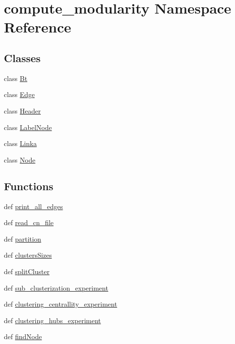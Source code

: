 \hypertarget{namespacecompute__modularity}{\section{compute\+\_\+modularity Namespace Reference}
\label{namespacecompute__modularity}
}
\subsection*{Classes}
\begin{DoxyCompactItemize}
\item 
class \hyperlink{classcompute__modularity_1_1_bt}{Bt}
\item 
class \hyperlink{classcompute__modularity_1_1_edge}{Edge}
\item 
class \hyperlink{classcompute__modularity_1_1_header}{Header}
\item 
class \hyperlink{classcompute__modularity_1_1_label_node}{Label\+Node}
\item 
class \hyperlink{classcompute__modularity_1_1_linka}{Linka}
\item 
class \hyperlink{classcompute__modularity_1_1_node}{Node}
\end{DoxyCompactItemize}
\subsection*{Functions}
\begin{DoxyCompactItemize}
\item 
def \hyperlink{namespacecompute__modularity_ae7003a81a318f8a965c997e545ed8637}{print\+\_\+all\+\_\+edges}
\item 
def \hyperlink{namespacecompute__modularity_ac8b393251a94473680052f2c0482706e}{read\+\_\+cn\+\_\+file}
\item 
def \hyperlink{namespacecompute__modularity_a607f9b8be1bf581cedf443b517adcf10}{partition}
\item 
def \hyperlink{namespacecompute__modularity_a3dea8443d139544a91b33a28ee635080}{clusters\+Sizes}
\item 
def \hyperlink{namespacecompute__modularity_a632a3219fb7710031adbb61fda6f7b21}{split\+Cluster}
\item 
def \hyperlink{namespacecompute__modularity_aa868b771a28de7a8784a1ac26c141492}{sub\+\_\+clusterization\+\_\+experiment}
\item 
def \hyperlink{namespacecompute__modularity_a3ecf6a23bb6726c84c851283f08dc2c9}{clustering\+\_\+centrallity\+\_\+experiment}
\item 
def \hyperlink{namespacecompute__modularity_ad7008fdd2317a9e3321e23c3518dc2df}{clustering\+\_\+hubs\+\_\+experiment}
\item 
def \hyperlink{namespacecompute__modularity_a03524b2cf695fb83898425ff0f804750}{find\+Node}
\end{DoxyCompactItemize}
